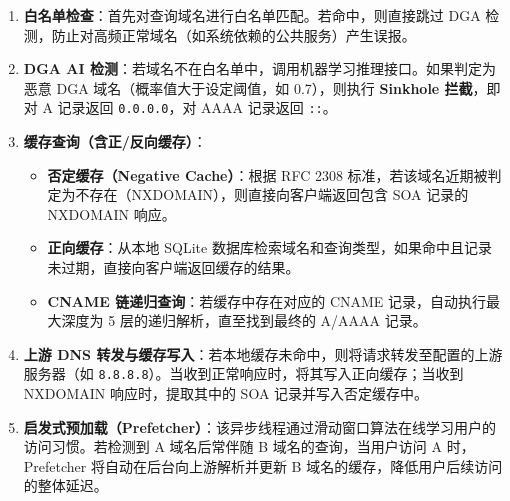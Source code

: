 \documentclass[11pt,a4paper]{ctexart}
\begin{document}
\begin{enumerate}
    \item \textbf{白名单检查}：首先对查询域名进行白名单匹配。若命中，则直接跳过 DGA 检测，防止对高频正常域名（如系统依赖的公共服务）产生误报。
    \item \textbf{DGA AI 检测}：若域名不在白名单中，调用机器学习推理接口。如果判定为恶意 DGA 域名（概率值大于设定阈值，如 0.7），则执行 \textbf{Sinkhole 拦截}，即对 A 记录返回 \texttt{0.0.0.0}，对 AAAA 记录返回 \texttt{::}。
    \item \textbf{缓存查询（含正/反向缓存）}：
    \begin{itemize}
        \item \textbf{否定缓存（Negative Cache）}：根据 RFC 2308 标准，若该域名近期被判定为不存在（NXDOMAIN），则直接向客户端返回包含 SOA 记录的 NXDOMAIN 响应。
        \item \textbf{正向缓存}：从本地 SQLite 数据库检索域名和查询类型，如果命中且记录未过期，直接向客户端返回缓存的结果。
        \item \textbf{CNAME 链递归查询}：若缓存中存在对应的 CNAME 记录，自动执行最大深度为 5 层的递归解析，直至找到最终的 A/AAAA 记录。
    \end{itemize}
    \item \textbf{上游 DNS 转发与缓存写入}：若本地缓存未命中，则将请求转发至配置的上游服务器（如 \texttt{8.8.8.8}）。当收到正常响应时，将其写入正向缓存；当收到 NXDOMAIN 响应时，提取其中的 SOA 记录并写入否定缓存中。
    \item \textbf{启发式预加载（Prefetcher）}：该异步线程通过滑动窗口算法在线学习用户的访问习惯。若检测到 A 域名后常伴随 B 域名的查询，当用户访问 A 时，Prefetcher 将自动在后台向上游解析并更新 B 域名的缓存，降低用户后续访问的整体延迟。
\end{enumerate}
\end{document}
